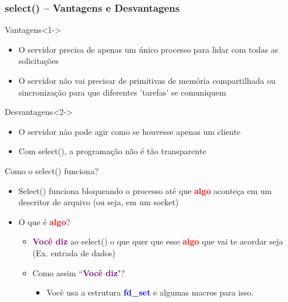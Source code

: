 \documentclass[10pt, xcolor=x11names]{beamer}
\begin{document}
\begin{frame}\frametitle{select() -- Vantagens e Desvantagens}
	\begin{block}{Vantagens}<1->
		\begin{itemize}
			\item O servidor precisa de apenas um único processo para lidar com todas as solicitações

			\item O servidor não vai precisar de primitivas de memória compartilhada ou sincronização para que diferentes 'tarefas' se comuniquem
		\end{itemize}
	\end{block}

	\begin{alertblock}{Desvantagens}<2->
		\begin{itemize}
			\item O servidor não pode agir como se houvesse apenas um cliente
			\item Com select(), a programação não é tão transparente
		\end{itemize}
	\end{alertblock}
	
\end{frame}

\begin{frame}
	\begin{block}{Como o select() funciona?}
		\begin{itemize}
			\item<1-> Select() funciona bloqueando o processo até que \textcolor{red}{\textbf{algo}} aconteça em um descritor de arquivo (ou seja, em um socket)

			\item<2-> O que é \textcolor{red}{\textbf{algo}}?
			\begin{itemize}
				\item \textcolor{purple}{\textbf{Você diz}} ao select() o que quer que esse \textcolor{red}{\textbf{algo}} que vai te acordar seja (Ex. entrada de dados)

				\item<3-> Como assim ``\textcolor{purple}{\textbf{Você diz}}"?
					\begin{itemize}
						\item Você usa a estrutura \textcolor{blue}{\textbf{fd\_set}} e algumas macros para isso.
					\end{itemize}

			\end{itemize}

		\end{itemize}
	\end{block}
	
\end{frame}
\end{document}
